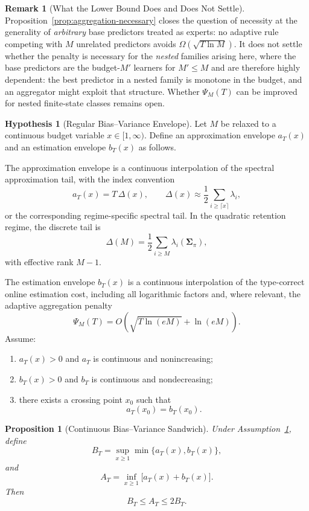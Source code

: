 \documentclass[12pt]{article}
\newtheorem{proposition}[theorem]{Proposition}
\theoremstyle{definition}
\newtheorem{remark}[theorem]{Remark}
\newtheorem{assumption}[theorem]{Hypothesis}
\newcommand{\PsiAgg}{\Psi}
\begin{document}
\begin{remark}[What the Lower Bound Does and Does Not Settle]
\label{rem:aggregation-scope}
Proposition~\ref{prop:aggregation-necessary} closes the question of necessity
at the generality of \emph{arbitrary} base predictors treated as experts: no
adaptive rule competing with $M$ unrelated predictors avoids
$\Omega(\sqrt{T\ln M})$.  It does not settle whether the penalty is necessary
for the \emph{nested} families arising here, where the base predictors are the
budget-$M'$ learners for $M'\le M$ and are therefore highly dependent: the best
predictor in a nested family is monotone in the budget, and an aggregator might
exploit that structure.  Whether $\PsiAgg_M(T)$ can be improved for nested
finite-state classes remains open.
\end{remark}

\begin{assumption}[Regular Bias--Variance Envelope]
\label{ass:regular-bv-envelope}
Let $M$ be relaxed to a continuous budget variable $x\in[1,\infty)$.  Define
an approximation envelope $a_T(x)$ and an estimation envelope $b_T(x)$ as
follows.

The approximation envelope is a continuous interpolation of the spectral
approximation tail, with the index convention
\[
a_T(x)
=
T\,\Delta(x),
\qquad
\Delta(x)
\approx
\frac12
\sum_{i\ge \lceil x\rceil}
\lambda_i,
\]
or the corresponding regime-specific spectral tail.  In the quadratic
retention regime, the discrete tail is
\[
\Delta(M)
=
\frac12
\sum_{i\ge M}
\lambda_i(\bm{\Sigma}_\pi),
\]
with effective rank $M-1$.

The estimation envelope $b_T(x)$ is a continuous interpolation of the
type-correct online estimation cost, including all logarithmic factors and,
where relevant, the adaptive aggregation penalty
\[
\PsiAgg_M(T)
=
O\!\left(
\sqrt{T\ln(eM)}
+
\ln(eM)
\right).
\]
Assume:
\begin{enumerate}[label=(\roman*)]
\item $a_T(x)>0$ and $a_T$ is continuous and nonincreasing;
\item $b_T(x)>0$ and $b_T$ is continuous and nondecreasing;
\item there exists a crossing point $x_0$ such that
\[
a_T(x_0)=b_T(x_0).
\]
\end{enumerate}
\end{assumption}

\begin{proposition}[Continuous Bias--Variance Sandwich]
\label{prop:continuous-bv-sandwich}
Under Assumption~\ref{ass:regular-bv-envelope}, define
\[
B_T
=
\sup_{x\ge1}
\min\{a_T(x),b_T(x)\},
\]
and
\[
A_T
=
\inf_{x\ge1}
\bigl[a_T(x)+b_T(x)\bigr].
\]
Then
\[
B_T
\le
A_T
\le
2B_T.
\]
\end{proposition}
\end{document}
